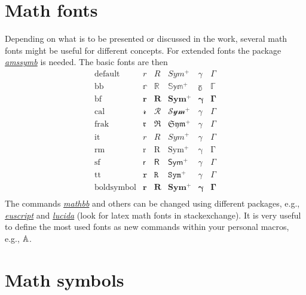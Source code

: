 \documentclass[a4paper,11pt,oneside]{book}
\newcommand{\imp}[1]{\underline{\textit{#1}}}
\begin{document}

\section{Math fonts}

Depending on what is to be presented or discussed in the work, several math fonts might be useful for different concepts. For extended fonts the package \imp{amssymb} is needed. The basic fonts are then
\[
	\begin{array}{lccccc}
	\text{default} & r & R & Sym^+ & \gamma & \Gamma \\
	\text{bb} & \mathbb{r} & \mathbb{R} & \mathbb{Sym^+} & \mathbb{\gamma}& \mathbb{\Gamma} \\ 
	\text{bf} & \mathbf{r} & \mathbf{R} & \mathbf{Sym^+} & \mathbf{\gamma}& \mathbf{\Gamma} \\
	\text{cal} & \mathcal{r} & \mathcal{R} & \mathcal{Sym^+} & \mathcal{\gamma}& \mathcal{\Gamma} \\
	\text{frak} & \mathfrak{r} & \mathfrak{R} & \mathfrak{Sym^+} & \mathfrak{\gamma}& \mathfrak{\Gamma} \\
	\text{it} & \mathit{r} & \mathit{R} & \mathit{Sym^+} & \mathit{\gamma}& \mathit{\Gamma} \\
	\text{rm} & \mathrm{r} & \mathrm{R} & \mathrm{Sym^+} & \mathrm{\gamma}& \mathrm{\Gamma} \\
	\text{sf} & \mathsf{r} & \mathsf{R} & \mathsf{Sym^+} & \mathsf{\gamma}& \mathsf{\Gamma} \\
	\text{tt} & \mathtt{r} & \mathtt{R} & \mathtt{Sym^+} & \mathtt{\gamma}& \mathtt{\Gamma} \\
	\text{boldsymbol} & \boldsymbol{r} & \boldsymbol{R} & \boldsymbol{Sym^+} & \boldsymbol{\gamma}& \boldsymbol{\Gamma} \\
	\end{array}
\]
The commands \imp{mathbb} and others can be changed using different packages, e.g., \imp{euscript} and \imp{lucida} (look for latex math fonts in stackexchange). It is very useful to define the most used fonts as new commands within your personal macros, e.g., $\mathbb{A}$.


\section{Math symbols}
\label{math_msymb}
\end{document}
